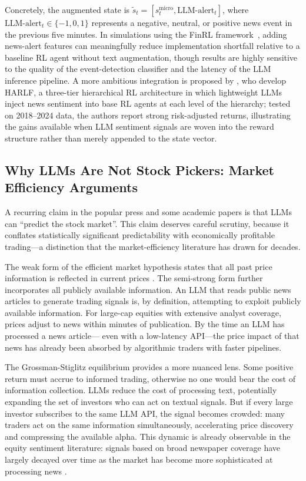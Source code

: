 Concretely, the augmented state is $\tilde{s}_t = [s_t^{\text{micro}},
\text{LLM-alert}_t]$, where $\text{LLM-alert}_t \in \{-1, 0, 1\}$ represents a negative,
neutral, or positive news event in the previous five minutes. In simulations using the FinRL framework~\citep{liu2022finrl}, adding news-alert features can meaningfully reduce implementation shortfall relative to a baseline RL agent without text augmentation, though results are highly sensitive to the quality of the event-detection
classifier and the latency of the LLM inference pipeline. A more ambitious integration
is proposed by \citet{CoriatBenhamou2025}, who develop HARLF, a three-tier hierarchical
RL architecture in which lightweight LLMs inject news sentiment into base RL agents at
each level of the hierarchy; tested on 2018--2024 data, the authors report strong
risk-adjusted returns, illustrating the gains available when LLM
sentiment signals are woven into the reward structure rather than merely appended to
the state vector.

\subsection{Why LLMs Are Not Stock Pickers: Market Efficiency Arguments}
\label{sec:ch10-llm-not-stock-pickers}

A recurring claim in the popular press and some academic papers is that LLMs can
``predict the stock market''. This claim deserves careful scrutiny, because it conflates
statistically significant predictability with economically profitable trading---a
distinction that the market-efficiency literature has drawn for decades.

The weak form of the efficient market hypothesis states that all past price information
is reflected in current prices \citep{fama1970efficient}. The semi-strong form further
incorporates all publicly available information. An LLM that reads public news articles
to generate trading signals is, by definition, attempting to exploit publicly available
information. For large-cap equities with extensive analyst coverage, prices adjust to
news within minutes of publication. By the time an LLM has processed a news article---
even with a low-latency API---the price impact of that news has already been absorbed by
algorithmic traders with faster pipelines.

The Grossman-Stiglitz equilibrium \citep{grossman1980impossibility} provides a more nuanced lens.
Some positive return must accrue to informed trading, otherwise no one would bear the
cost of information collection. LLMs reduce the cost of processing text, potentially
expanding the set of investors who can act on textual signals. But if every large
investor subscribes to the same LLM API, the signal becomes crowded: many traders act
on the same information simultaneously, accelerating price discovery and compressing the
available alpha. This dynamic is already observable in the equity sentiment literature:
signals based on broad newspaper coverage have largely decayed over time as the market
has become more sophisticated at processing news \citep{tetlock2007giving}.

